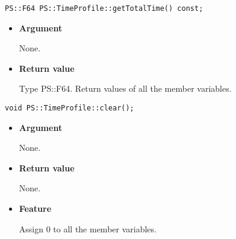 \mbox{}

\begin{screen}
\begin{verbatim}
PS::F64 PS::TimeProfile::getTotalTime() const;
\end{verbatim}
\end{screen}

\begin{itemize}

\item{{\bf Argument}}

  None.

\item{{\bf Return value}}

  Type PS::F64. Return values of all the member variables.

\end{itemize}

\mbox{}

\begin{screen}
\begin{verbatim}
void PS::TimeProfile::clear();
\end{verbatim}
\end{screen}

\begin{itemize}

\item{{\bf Argument}}

 None.

\item{{\bf Return value}}

 None.

\item{{\bf Feature}}

 Assign 0 to all the member variables.

\end{itemize}
